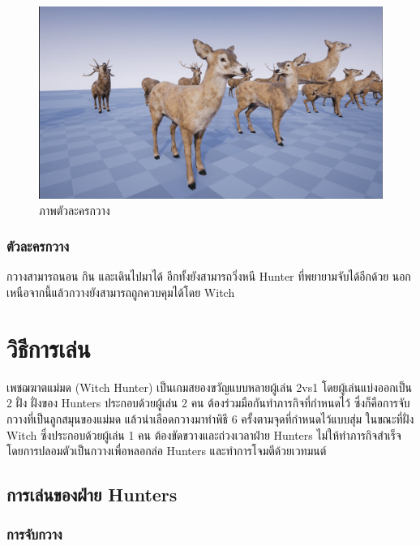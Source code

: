 \begin{figure}[p]
  \begin{center}
  \includegraphics[width=\textwidth]{./img/characters/deerdoe.png}
  \end{center}
  \caption[ภาพตัวละครกวาง]{ภาพตัวละครกวาง}
  \label{ภาพตัวละครกวาง}
\end{figure}

\subsubsection{ตัวละครกวาง}

กวางสามารถนอน กิน และเดินไปมาได้ อีกทั้งยังสามารถวิ่งหนี Hunter ที่พยายามจับได้อีกด้วย นอกเหนือจากนี้แล้วกวางยังสามารถถูกควบคุมได้โดย Witch

\section{วิธีการเล่น}

เพชฌฆาตแม่มด (Witch Hunter) เป็นเกมสยองขวัญแบบหลายผู้เล่น 2vs1 โดยผู้เล่นแบ่งออกเป็น 2 ฝั่ง 
ฝั่งของ Hunters ประกอบด้วยผู้เล่น 2 คน ต้องร่วมมือกันทำภารกิจที่กำหนดไว้ ซึ่งก็คือการจับกวางที่เป็นลูกสมุนของแม่มด 
แล้วนำเลือดกวางมาทำพิธี 6 ครั้งตามจุดที่กำหนดไว้แบบสุ่ม ในขณะที่ฝั่ง Witch ซึ่งประกอบด้วยผู้เล่น 1 คน
ต้องขัดขวางและถ่วงเวลาฝ่าย Hunters ไม่ให้ทำภารกิจสำเร็จ โดยการปลอมตัวเป็นกวางเพื่อหลอกล่อ Hunters และทำการโจมตีด้วยเวทมนต์

\subsection{การเล่นของฝ่าย Hunters}

\subsubsection{การจับกวาง}

